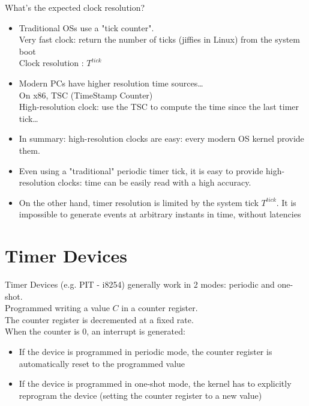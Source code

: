 What's the expected clock resolution?
\begin{itemize}
    \item Traditional OSs use a "tick counter". \\
    Very fast clock: return the number of ticks (jiffies in Linux) from the system boot\\
    Clock resolution : $T^{tick}$
    \item Modern PCs have higher resolution time sources\dots\\
    On x86, TSC (TimeStamp Counter)\\
    High-resolution clock: use the TSC to compute the time since the last timer tick\dots
    \item In summary: high-resolution clocks are easy: every modern OS kernel provide them.
    \item Even using a "traditional" periodic timer tick, it is easy to provide high-resolution clocks: time can be easily read with a high accuracy. 
    \item On the other hand, timer resolution is limited by the system tick $T^{tick}$. It is impossible to generate events at arbitrary instants in time, without latencies
\end{itemize}


\section{Timer Devices}
Timer Devices (e.g. PIT - i8254) generally work in 2 modes: periodic and one-shot.\\
Programmed writing a value $C$ in a counter register.\\
The counter register is decremented at a fixed rate.\\
When the counter is 0, an interrupt is generated:
\begin{itemize}
    \item If the device is programmed in periodic mode, the counter register is automatically reset to the programmed value
    \item If the device is programmed in one-shot mode, the kernel has to explicitly reprogram the device (setting the counter register to a new value)
\end{itemize}

